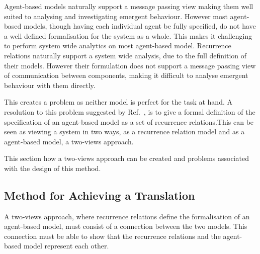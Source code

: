 \documentclass{article}
\begin{document}
Agent-based models naturally support a message passing view making them well suited to analysing and investigating emergent behaviour. However most agent-based models, though having each individual agent be fully specified, do not have a well defined formalisation for the system as a whole. This makes it challenging to perform system wide analytics on most agent-based model. Recurrence relations naturally support a system wide analysis, due to the full definition of their models. However their formulation does not support a message passing view of communication between components, making it difficult to analyse emergent behaviour with them directly. 

This creates a problem as neither model is perfect for the task at hand. A resolution to this problem suggested by Ref.~\cite{econmistsnoabm}, is to give a formal definition of the specification of an agent-based model as a set of recurrence relations.This can be seen as viewing a system in two ways, as a recurrence relation model and as a agent-based model, a two-views approach.

This section how a two-views approach can be created and problems associated with the design of this method. 

\subsection{Method for Achieving a Translation}
A two-views approach, where recurrence relations define the formalisation of an agent-based model, must consist of a connection between the two models. This connection must be able to show that the recurrence relations and the agent-based model represent each other.  

\end{document}
